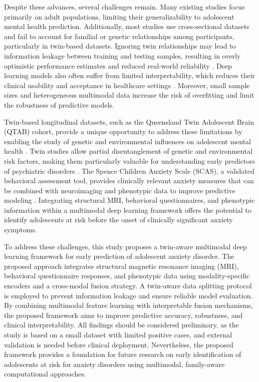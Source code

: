 \documentclass[10pt,letterpaper]{article}
\begin{document}
Despite these advances, several challenges remain. Many existing studies focus primarily on adult populations, limiting their generalizability to adolescent mental health prediction. Additionally, most studies use cross-sectional datasets and fail to account for familial or genetic relationships among participants, particularly in twin-based datasets. Ignoring twin relationships may lead to information leakage between training and testing samples, resulting in overly optimistic performance estimates and reduced real-world reliability \cite{ref32,ref33,ref34}. Deep learning models also often suffer from limited interpretability, which reduces their clinical usability and acceptance in healthcare settings \cite{ref15,ref16}. Moreover, small sample sizes and heterogeneous multimodal data increase the risk of overfitting and limit the robustness of predictive models.

Twin-based longitudinal datasets, such as the Queensland Twin Adolescent Brain (QTAB) cohort, provide a unique opportunity to address these limitations by enabling the study of genetic and environmental influences on adolescent mental health \cite{ref32}. Twin studies allow partial disentanglement of genetic and environmental risk factors, making them particularly valuable for understanding early predictors of psychiatric disorders \cite{ref33,ref34}. The Spence Children Anxiety Scale (SCAS), a validated behavioral assessment tool, provides clinically relevant anxiety measures that can be combined with neuroimaging and phenotypic data to improve predictive modeling \cite{ref35}. Integrating structural MRI, behavioral questionnaires, and phenotypic information within a multimodal deep learning framework offers the potential to identify adolescents at risk before the onset of clinically significant anxiety symptoms.

To address these challenges, this study proposes a twin-aware multimodal deep learning framework for early prediction of adolescent anxiety disorder. The proposed approach integrates structural magnetic resonance imaging (MRI), behavioral questionnaire responses, and phenotypic data using modality-specific encoders and a cross-modal fusion strategy. A twin-aware data splitting protocol is employed to prevent information leakage and ensure reliable model evaluation. By combining multimodal feature learning with interpretable fusion mechanisms, the proposed framework aims to improve predictive accuracy, robustness, and clinical interpretability. All findings should be considered preliminary, as the study is based on a small dataset with limited positive cases, and external validation is needed before clinical deployment. Nevertheless, the proposed framework provides a foundation for future research on early identification of adolescents at risk for anxiety disorders using multimodal, family-aware computational approaches.
\end{document}
